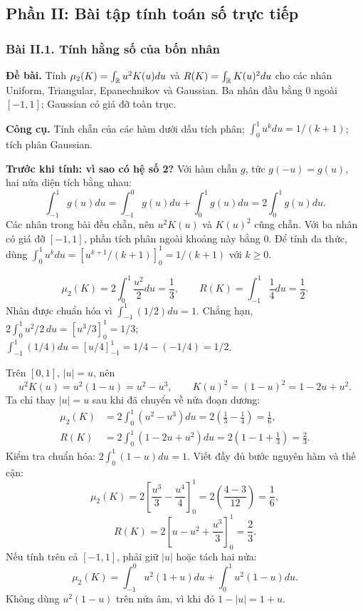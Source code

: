 \subsection{Phần II: Bài tập tính toán số trực tiếp}

\subsubsection*{Bài II.1. Tính hằng số của bốn nhân}\label{ot45:constants}
\textbf{Đề bài.} Tính $\mu_2(K)=\int_{\mathbb R}u^2K(u)du$ và $R(K)=\int_{\mathbb R}K(u)^2du$
cho các nhân Uniform, Triangular, Epanechnikov và Gaussian.
Ba nhân đầu bằng 0 ngoài $[-1,1]$; Gaussian có giá đỡ toàn trục.

\textbf{Công cụ.} Tính chẵn của các hàm dưới dấu tích phân;
$\int_0^1u^kdu=1/(k+1)$; tích phân Gaussian.

\textbf{Trước khi tính: vì sao có hệ số 2?}
Với hàm chẵn $g$, tức $g(-u)=g(u)$, hai nửa diện tích bằng nhau:
\[
\int_{-1}^1g(u)du=\int_{-1}^0g(u)du+\int_0^1g(u)du
=2\int_0^1g(u)du.
\]
Các nhân trong bài đều chẵn, nên $u^2K(u)$ và $K(u)^2$ cũng chẵn.
Với ba nhân có giá đỡ $[-1,1]$, phần tích phân ngoài khoảng này bằng 0.
Để tính đa thức, dùng
$\int_0^1u^kdu=[u^{k+1}/(k+1)]_0^1=1/(k+1)$ với $k\geq0$.

\[
\mu_2(K)=2\int_0^1\frac{u^2}{2}du=\frac13,\qquad
R(K)=\int_{-1}^1\frac14du=\frac12.
\]
Nhân được chuẩn hóa vì $\int_{-1}^1(1/2)du=1$.
Chẳng hạn,
$2\int_0^1u^2/2\,du=[u^3/3]_0^1=1/3$;
$\int_{-1}^1(1/4)du=[u/4]_{-1}^1=1/4-(-1/4)=1/2$.

Trên $[0,1]$, $|u|=u$, nên
\[
u^2K(u)=u^2(1-u)=u^2-u^3,\qquad
K(u)^2=(1-u)^2=1-2u+u^2.
\]
Ta chỉ thay $|u|=u$ sau khi đã chuyển về nửa đoạn dương:
\begin{align*}
\mu_2(K)&=2\int_0^1(u^2-u^3)du
=2\left(\frac13-\frac14\right)=\frac16,\\
R(K)&=2\int_0^1(1-2u+u^2)du
=2\left(1-1+\frac13\right)=\frac23.
\end{align*}
Kiểm tra chuẩn hóa: $2\int_0^1(1-u)du=1$.
Viết đầy đủ bước nguyên hàm và thế cận:
\[
\mu_2(K)=2\left[\frac{u^3}{3}-\frac{u^4}{4}\right]_0^1
=2\left(\frac{4-3}{12}\right)=\frac16,
\]
\[
R(K)=2\left[u-u^2+\frac{u^3}{3}\right]_0^1=\frac23.
\]
Nếu tính trên cả $[-1,1]$, phải giữ $|u|$ hoặc tách hai nửa:
\[
\mu_2(K)=\int_{-1}^0u^2(1+u)du+\int_0^1u^2(1-u)du.
\]
Không dùng $u^2(1-u)$ trên nửa âm, vì khi đó $1-|u|=1+u$.


